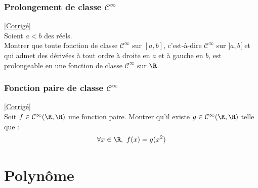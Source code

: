 \documentclass{book}
\begin{document}
	\subsection{Prolongement de classe $\mathcal C^\infty$ }
	\textcolor{blue}{\hyperref[Prolongement de classe C infini corrigé]{[Corrigé]}}\\
	\label{Prolongement de classe C infini}
	Soient $a<b$ des réels.\\
	Montrer que toute fonction de classe $\mathcal C^\infty$ sur $[a,b]$, c'est-à-dire $\mathcal C^\infty$ sur $]a,b[$ et qui admet des dérivées à tout ordre à droite en $a$ et à gauche en $b$, est prolongeable en une fonction de classe $\mathcal C^\infty$ sur $\R$.
	
	\subsection{Fonction paire de classe $\mathcal C^\infty$}
	\textcolor{blue}{\hyperref[Fonction paire de classe C infini corrigé]{[Corrigé]}}\\
	\label{Fonction paire de classe C infini}
	Soit $f\in \mathcal C^\infty(\R,\R)$ une fonction paire. Montrer qu'il existe $g\in \mathcal C^\infty(\R,\R)$ telle que :
	$$\forall x\in \R,\ f(x)=g(x^2)$$
	
	
\chapter{Polynôme}
\end{document}
